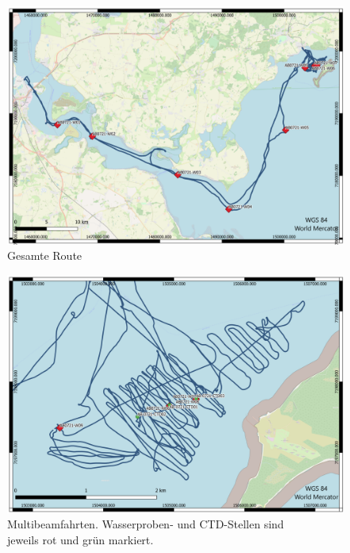 \begin{figure}[]
    \centering
    \includegraphics[width=0.8\linewidth]{Bilder/QGIS/Gesamte_route.png}
    \caption{Gesamte Route}
    \label{fig:route}
\end{figure}
\begin{figure}
    \centering
    \includegraphics[width=0.8\linewidth]{Bilder/QGIS/multibeam.png}
    \caption{Multibeamfahrten. Wasserproben- und CTD-Stellen sind\\jeweils rot und grün markiert.}
    \label{fig:multibeam_route}
\end{figure}
